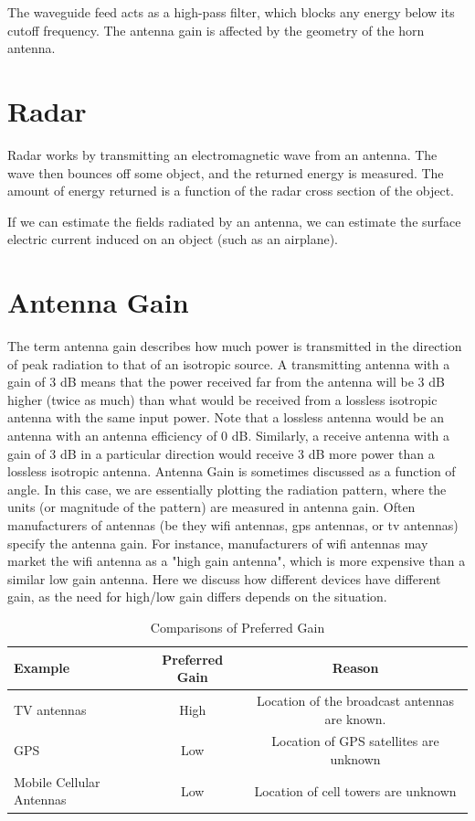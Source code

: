 \documentclass[a4paper,12pt]{report}
\begin{document}
The waveguide feed acts as a high-pass filter,
which blocks any energy below its cutoff frequency.
The antenna gain is affected by the geometry of the horn antenna.

\section{Radar}

Radar works by transmitting an electromagnetic wave from an antenna.
The wave then bounces off some object, and the returned energy is measured.
The amount of energy returned is a function of the radar cross section of the object.

If we can estimate the fields radiated by an antenna,
we can estimate the surface electric current induced on an object
(such as an airplane).

\section{Antenna Gain}

The term antenna gain describes how much power is transmitted
in the direction of peak radiation to that of an isotropic source.
A transmitting antenna with a gain of 3 dB means that the power received
far from the antenna will be 3 dB higher (twice as much) than
what would be received from a lossless isotropic antenna with the
same input power. Note that a lossless antenna would be an antenna
with an antenna efficiency of 0 dB.
Similarly, a receive antenna with a gain of 3 dB in a particular direction
would receive 3 dB more power than a lossless isotropic antenna.
Antenna Gain is sometimes discussed as a function of angle.
In this case, we are essentially plotting the radiation pattern,
where the units (or magnitude of the pattern) are measured in antenna gain.
Often manufacturers of antennas
(be they wifi antennas, gps antennas, or tv antennas) specify the antenna gain.
For instance, manufacturers of wifi antennas may market the wifi antenna as a "high gain antenna",
which is more expensive than a similar low gain antenna.
Here we discuss how different devices have different gain,
as the need for high/low gain differs depends on the situation.

\begin{table}[h]
  \centering
  \caption{Comparisons of Preferred Gain}
  \label{table}
  \begin{tabular}[]{lcc}
    \hline
    Example & Preferred Gain & Reason \\
    \hline\hline
    TV antennas & High & Location of the broadcast antennas are known. \\
    \hline
    GPS & Low & Location of GPS satellites are unknown \\
    \hline
    Mobile Cellular Antennas & Low & Location of cell towers are unknown \\
    \hline
  \end{tabular}
\end{table}
\end{document}
